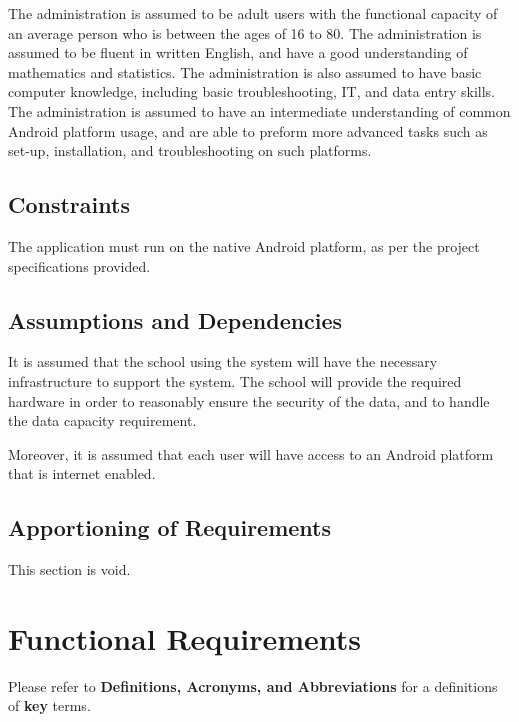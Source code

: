 \documentclass[]{article}
\begin{document}
The administration is assumed to be adult users with the functional capacity of
an average person who is between the ages of 16 to 80. The administration is
assumed to be fluent in written English, and have a good understanding of
mathematics and statistics. The administration is also assumed to have basic
computer knowledge, including basic troubleshooting, IT, and data entry skills.
The administration is assumed to have an intermediate understanding of common
Android platform usage, and are able to preform more advanced tasks such as
set-up, installation, and troubleshooting on such platforms.

\subsection{Constraints}
\label{sub:constraints}
The application must run on the native Android platform, as per the project
specifications provided.

\subsection{Assumptions and Dependencies}
\label{sub:assumptions_and_dependencies}
It is assumed that the school using the system will have the necessary infrastructure to support the system. The school will provide the required hardware in order to reasonably ensure the security of the data, and to handle the data capacity requirement.

Moreover, it is assumed that each user will have access to an Android platform that is internet enabled.

\subsection{Apportioning of Requirements}
\label{sub:apportioning_of_requirements}
This section is void.


\section{Functional Requirements}
\label{sec:functional_requirements}

Please refer to \textbf{Definitions, Acronyms, and Abbreviations} for a definitions of \textbf{key} terms.

\end{document}
